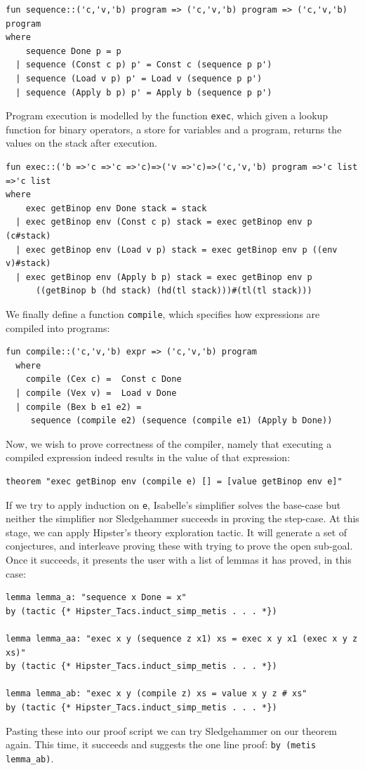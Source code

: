 \begin{verbatim}
fun sequence::('c,'v,'b) program => ('c,'v,'b) program => ('c,'v,'b) program
where
    sequence Done p = p
  | sequence (Const c p) p' = Const c (sequence p p')
  | sequence (Load v p) p' = Load v (sequence p p')
  | sequence (Apply b p) p' = Apply b (sequence p p')
\end{verbatim}
Program execution is modelled by the function \texttt{exec}, which given a lookup function for binary operators, a store for variables and a program, returns the values on the stack after execution.
\begin{verbatim}
fun exec::('b =>'c =>'c =>'c)=>('v =>'c)=>('c,'v,'b) program =>'c list =>'c list
where
    exec getBinop env Done stack = stack
  | exec getBinop env (Const c p) stack = exec getBinop env p (c#stack) 
  | exec getBinop env (Load v p) stack = exec getBinop env p ((env v)#stack)
  | exec getBinop env (Apply b p) stack = exec getBinop env p 
  	  ((getBinop b (hd stack) (hd(tl stack)))#(tl(tl stack)))
\end{verbatim}
We finally define a function \texttt{compile}, which specifies how expressions are compiled into programs:
\begin{verbatim}
fun compile::('c,'v,'b) expr => ('c,'v,'b) program
  where
    compile (Cex c) =  Const c Done
  | compile (Vex v) =  Load v Done
  | compile (Bex b e1 e2) = 
     sequence (compile e2) (sequence (compile e1) (Apply b Done))
\end{verbatim}
Now, we wish to prove correctness of the compiler, namely that executing a compiled expression indeed results in the value of that expression: 
\begin{verbatim}
theorem "exec getBinop env (compile e) [] = [value getBinop env e]"
\end{verbatim}
If we try to apply induction on \texttt{e}, Isabelle's simplifier solves the base-case but neither the simplifier nor Sledgehammer succeeds in proving the step-case. At this stage, we can apply Hipster's theory exploration tactic. It will generate a set of conjectures, and interleave proving these with trying to prove the open sub-goal. Once it succeeds, it presents the user with a list of lemmas it has proved, in this case:
\begin{small}
\begin{verbatim}
lemma lemma_a: "sequence x Done = x"
by (tactic {* Hipster_Tacs.induct_simp_metis . . . *})

lemma lemma_aa: "exec x y (sequence z x1) xs = exec x y x1 (exec x y z xs)"
by (tactic {* Hipster_Tacs.induct_simp_metis . . . *})

lemma lemma_ab: "exec x y (compile z) xs = value x y z # xs"
by (tactic {* Hipster_Tacs.induct_simp_metis . . . *})
\end{verbatim}
\end{small}
Pasting these into our proof script we can try Sledgehammer on our theorem again. This time, it succeeds and suggests the one line proof: \texttt{by (metis lemma\_ab)}.

